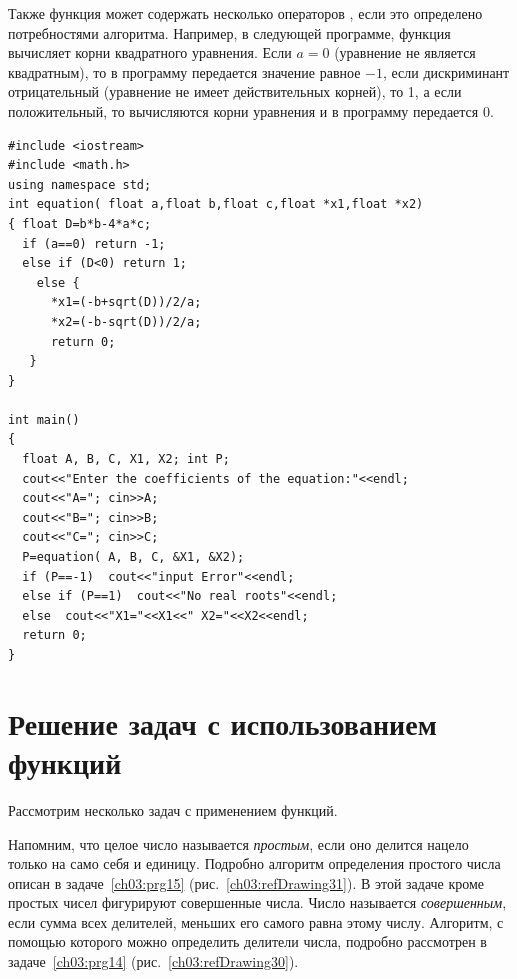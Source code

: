 Также функция может содержать несколько операторов , если это определено потребностями
алгоритма. Например, в следующей программе, функция  вычисляет корни квадратного уравнения.
Если $a=0$ (уравнение не является квадратным), то в программу передается значение равное
$-1$, если дискриминант отрицательный (уравнение не имеет действительных корней), то
1, а если положительный, то  вычисляются корни уравнения и в программу передается 0.
\begin{lstlisting}
#include <iostream>
#include <math.h>
using namespace std;
int equation( float a,float b,float c,float *x1,float *x2)
{ float D=b*b-4*a*c;
  if (a==0) return -1;
  else if (D<0) return 1;
    else {
      *x1=(-b+sqrt(D))/2/a;
      *x2=(-b-sqrt(D))/2/a;
      return 0;
   }
}

int main()
{
  float A, B, C, X1, X2; int P;
  cout<<"Enter the coefficients of the equation:"<<endl;
  cout<<"A="; cin>>A;
  cout<<"B="; cin>>B;
  cout<<"C="; cin>>C;
  P=equation( A, B, C, &X1, &X2);
  if (P==-1)  cout<<"input Error"<<endl;
  else if (P==1)  cout<<"No real roots"<<endl;
  else  cout<<"X1="<<X1<<" X2="<<X2<<endl;
  return 0;
}
\end{lstlisting}

\section[Решение задач с использованием функций]{Решение задач с использованием функций}
Рассмотрим несколько задач с применением функций.


Напомним, что целое число называется \emph{простым}, если оно делится нацело только на само себя и единицу.
Подробно алгоритм определения простого числа описан в задаче~\ref{ch03:prg15} (рис.~\ref{ch03:refDrawing31}). 
В этой задаче кроме простых чисел
фигурируют совершенные числа. Число называется \emph{совершенным}, если сумма всех делителей, меньших его
самого равна этому числу. Алгоритм, с помощью которого можно определить делители числа, подробно рассмотрен 
в задаче~\ref{ch03:prg14} (рис.~\ref{ch03:refDrawing30}).

